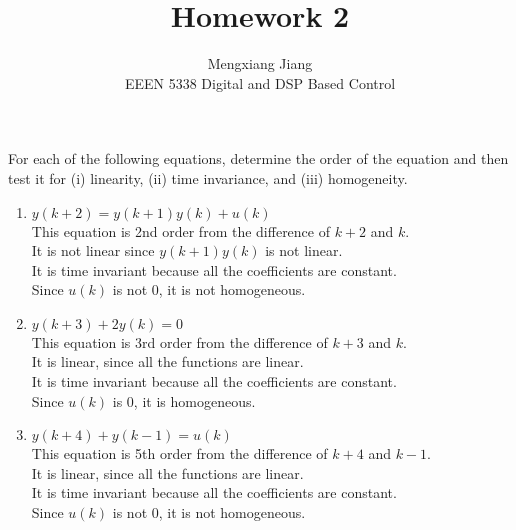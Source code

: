\documentclass[12pt]{article}
\newenvironment{problem}[2][Problem]{\begin{trivlist}
\item[\hskip \labelsep {\bfseries #1}\hskip \labelsep {\bfseries #2.}]}{\end{trivlist}}
\begin{document}
 
 
\title{Homework 2}%
\author{Mengxiang Jiang\\ %
EEEN 5338 Digital and DSP Based Control} %
 
\maketitle
 
\begin{problem}{1} %
    For each of the following equations, determine the order of the
    equation and then test it for (i) linearity, (ii) time invariance, and (iii)
    homogeneity.
    \begin{enumerate}[label=\alph*.]
        \item $y(k+2) = y(k+1)y(k) + u(k)$\\
        This equation is 2nd order from the difference of $k+2$ and $k$.\\
        It is not linear since $y(k+1)y(k)$ is not linear.\\
        It is time invariant because all the coefficients are constant.\\
        Since $u(k)$ is not 0, it is not homogeneous.

        \item $y(k+3) + 2y(k) = 0$\\
        This equation is 3rd order from the difference of $k+3$ and $k$.\\
        It is linear, since all the functions are linear.\\
        It is time invariant because all the coefficients are constant.\\
        Since $u(k)$ is 0, it is homogeneous.
        
        \item $y(k+4) + y(k-1) = u(k)$\\
        This equation is 5th order from the difference of $k+4$ and $k-1$.\\
        It is linear, since all the functions are linear.\\
        It is time invariant because all the coefficients are constant.\\
        Since $u(k)$ is not 0, it is not homogeneous.


\end{enumerate}
\end{problem}
\end{document}
